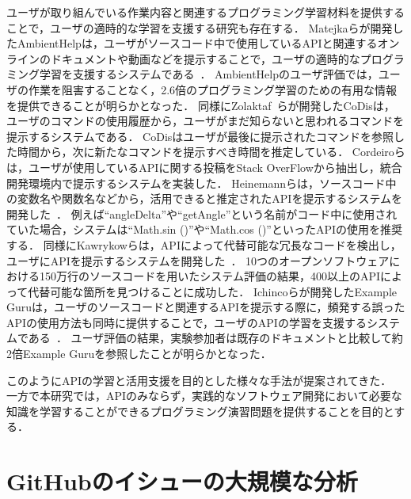 ユーザが取り組んでいる作業内容と関連するプログラミング学習材料を提供することで，ユーザの適時的な学習を支援する研究も存在する．
Matejkaらが開発したAmbientHelpは，ユーザがソースコード中で使用しているAPIと関連するオンラインのドキュメントや動画などを提示することで，ユーザの適時的なプログラミング学習を支援するシステムである~\cite{Matejka_Ambient_Help}．
AmbientHelpのユーザ評価では，ユーザの作業を阻害することなく，2.6倍のプログラミング学習のための有用な情報を提供できることが明らかとなった．
同様にZolaktaf~\cite{Zolaktaf_Recommending_Commands}らが開発したCoDisは，ユーザのコマンドの使用履歴から，ユーザがまだ知らないと思われるコマンドを提示するシステムである．
CoDisはユーザが最後に提示されたコマンドを参照した時間から，次に新たなコマンドを提示すべき時間を推定している．
Cordeiroらは，ユーザが使用しているAPIに関する投稿をStack OverFlowから抽出し，統合開発環境内で提示するシステムを実装した\cite{Cordeiro_2012_extract_QA_SO}．
Heinemannらは，ソースコード中の変数名や関数名などから，活用できると推定されたAPIを提示するシステムを開発した~\cite{Heinemann_Identifier_Based_API_Recommendation}．
例えば``angleDelta''や``getAngle''という名前がコード中に使用されていた場合，システムは``Math.sin ()''や``Math.cos ()''といったAPIの使用を推奨する．
同様にKawrykowらは，APIによって代替可能な冗長なコードを検出し，ユーザにAPIを提示するシステムを開発した~\cite{Kawrykow_Improving_API_Usage}．
10つのオープンソフトウェアにおける150万行のソースコードを用いたシステム評価の結果，400以上のAPIによって代替可能な箇所を見つけることに成功した．
Ichincoらが開発したExample Guruは，ユーザのソースコードと関連するAPIを提示する際に，頻発する誤ったAPIの使用方法も同時に提供することで，ユーザのAPIの学習を支援するシステムである~\cite{Ichinco_Suggesting_API_Usage}．
ユーザ評価の結果，実験参加者は既存のドキュメントと比較して約2倍Example Guruを参照したことが明らかとなった．

このようにAPIの学習と活用支援を目的とした様々な手法が提案されてきた．
一方で本研究では，APIのみならず，実践的なソフトウェア開発において必要な知識を学習することができるプログラミング演習問題を提供することを目的とする．


\section{GitHubのイシューの大規模な分析}

